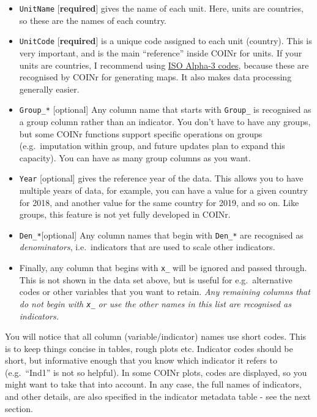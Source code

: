 \documentclass[
]{book}
\providecommand{\tightlist}{%
  \setlength{\itemsep}{0pt}\setlength{\parskip}{0pt}}
\begin{document}
\begin{itemize}
\tightlist
\item
  \texttt{UnitName} {[}\textbf{required}{]} gives the name of each unit. Here, units are countries, so these are the names of each country.
\item
  \texttt{UnitCode} {[}\textbf{required}{]} is a unique code assigned to each unit (country). This is very important, and is the main ``reference'' inside COINr for units. If your units are countries, I recommend using \href{https://en.wikipedia.org/wiki/ISO_3166-1_alpha-3}{ISO Alpha-3 codes}, because these are recognised by COINr for generating maps. It also makes data processing generally easier.
\item
  \texttt{Group\_*} {[}optional{]} Any column name that starts with \texttt{Group\_} is recognised as a group column rather than an indicator. You don't have to have any groups, but some COINr functions support specific operations on groups (e.g.~imputation within group, and future updates plan to expand this capacity). You can have as many group columns as you want.
\item
  \texttt{Year} {[}optional{]} gives the reference year of the data. This allows you to have multiple years of data, for example, you can have a value for a given country for 2018, and another value for the same country for 2019, and so on. Like groups, this feature is not yet fully developed in COINr.
\item
  \texttt{Den\_*}{[}optional{]} Any column names that begin with \texttt{Den\_*} are recognised as \emph{denominators}, i.e.~indicators that are used to scale other indicators.
\item
  Finally, any column that begins with \texttt{x\_} will be ignored and passed through. This is not shown in the data set above, but is useful for e.g.~alternative codes or other variables that you want to retain. \emph{Any remaining columns that do not begin with \texttt{x\_} or use the other names in this list are recognised as indicators.}
\end{itemize}

You will notice that all column (variable/indicator) names use short codes. This is to keep things concise in tables, rough plots etc. Indicator codes should be short, but informative enough that you know which indicator it refers to (e.g.~``Ind1'' is not so helpful). In some COINr plots, codes are displayed, so you might want to take that into account. In any case, the full names of indicators, and other details, are also specified in the indicator metadata table - see the next section.
\end{document}
